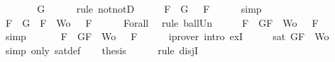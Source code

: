 \begin{isabellebody}
\ \ \isamarkupfalse%
\ \isamarkupfalse%
\ {\isachardoublequoteopen}{\isasymA}\ {\isasymTurnstile}\ G{\isachardoublequoteclose}\isanewline
\ \ \ \ \isamarkupfalse%
\ {\isacharparenleft}rule\ notnotD{\isacharparenright}\isanewline
\ \ \isamarkupfalse%
\ \isamarkupfalse%
\ {\isachardoublequoteopen}{\isasymforall}F\ {\isasymin}\ {\isacharbraceleft}G{\isacharbraceright}{\isachardot}\ {\isasymA}\ {\isasymTurnstile}\ F{\isachardoublequoteclose}\isanewline
\ \ \ \ \isamarkupfalse%
\ simp\isanewline
\ \ \isamarkupfalse%
\ \isamarkupfalse%
\ {\isachardoublequoteopen}{\isasymforall}F\ {\isasymin}\ {\isacharparenleft}{\isacharbraceleft}G{\isacharbraceright}\ {\isasymunion}\ {\isacharparenleft}{\isacharbraceleft}F{\isacharbraceright}\ {\isasymunion}\ Wo{\isacharparenright}{\isacharparenright}{\isachardot}\ {\isasymA}\ {\isasymTurnstile}\ F{\isachardoublequoteclose}\isanewline
\ \ \ \ \isamarkupfalse%
\ Forall{}\ \isamarkupfalse%
\ {\isacharparenleft}rule\ ball{\isacharunderscore}Un{\isacharparenright}\isanewline
\ \ \isamarkupfalse%
\ \isamarkupfalse%
\ {\isachardoublequoteopen}{\isasymforall}F\ {\isasymin}\ {\isacharbraceleft}G{\isacharcomma}F{\isacharbraceright}\ {\isasymunion}\ Wo{\isachardot}\ {\isasymA}\ {\isasymTurnstile}\ F{\isachardoublequoteclose}\isanewline
\ \ \ \ \isamarkupfalse%
\ simp\isanewline
\ \ \isamarkupfalse%
\ \isamarkupfalse%
\ {\isachardoublequoteopen}{\isasymexists}{\isasymA}{\isachardot}\ {\isasymforall}F\ {\isasymin}\ {\isacharparenleft}{\isacharbraceleft}G{\isacharcomma}F{\isacharbraceright}\ {\isasymunion}\ Wo{\isacharparenright}{\isachardot}\ {\isasymA}\ {\isasymTurnstile}\ F{\isachardoublequoteclose}\isanewline
\ \ \ \ \isamarkupfalse%
\ {\isacharparenleft}iprover\ intro{\isacharcolon}\ exI{\isacharparenright}\isanewline
\ \ \isamarkupfalse%
\ \isamarkupfalse%
\ {\isachardoublequoteopen}sat\ {\isacharparenleft}{\isacharbraceleft}G{\isacharcomma}F{\isacharbraceright}\ {\isasymunion}\ Wo{\isacharparenright}{\isachardoublequoteclose}\isanewline
\ \ \ \ \isamarkupfalse%
\ {\isacharparenleft}simp\ only{\isacharcolon}\ sat{\isacharunderscore}def{\isacharparenright}\isanewline
\ \ \isamarkupfalse%
\ {\isacharquery}thesis\isanewline
\ \ \ \ \isamarkupfalse%
\ {\isacharparenleft}rule\ disjI{}{\isacharparenright}\isanewline

\end{isabellebody}
